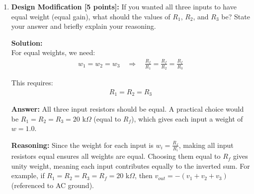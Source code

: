 \documentclass[11pt]{article}
\newenvironment{solution}
    {\color{blue}\textbf{Solution:}\\}
    {}
\begin{document}
\begin{enumerate}[label=\textbf{3.\arabic*}]
\begin{solution}
\textbf{Inverted and Weighted Output:}

The output is inverted because current flowing into the inverting node (from positive input voltages) must flow out through $R_f$, pulling the output below $V_{ref}$. Each input is weighted by its ratio $\frac{R_f}{R_i}$, meaning inputs with smaller resistors have larger weights (contribute more to the output). This allows precise control of how much each signal contributes to the sum.

\textbf{All Inputs at $V_{ref}$:}

If $v_1 = v_2 = v_3 = V_{ref} = 7.5$ V, then $(v_i - V_{ref}) = 0$ for all inputs. No current flows through any input resistor, so $i_f = 0$, and $v_{out} = V_{ref} = 7.5$ V. The output remains at the AC ground reference.

\textbf{Practical Application:}

Audio mixing consoles use summing amplifiers to combine multiple audio signals (microphones, instruments) into a single output channel. Each input can be weighted differently (volume control) by choosing appropriate resistor values, and the mixed signal can be inverted back if needed with another stage.
\end{solution}

\vspace{1cm}
    
    \item \textbf{Design Modification [5 points]:} If you wanted all three inputs to have equal weight (equal gain), what should the values of $R_1$, $R_2$, and $R_3$ be? State your answer and briefly explain your reasoning.

\begin{solution}
For equal weights, we need:
\begin{align*}
w_1 = w_2 = w_3 \quad \Rightarrow \quad \frac{R_f}{R_1} = \frac{R_f}{R_2} = \frac{R_f}{R_3}
\end{align*}

This requires:
\begin{align*}
R_1 = R_2 = R_3
\end{align*}

\textbf{Answer:} All three input resistors should be equal. A practical choice would be $R_1 = R_2 = R_3 = 20$ k$\Omega$ (equal to $R_f$), which gives each input a weight of $w = 1.0$.

\textbf{Reasoning:} Since the weight for each input is $w_i = \frac{R_f}{R_i}$, making all input resistors equal ensures all weights are equal. Choosing them equal to $R_f$ gives unity weight, meaning each input contributes equally to the inverted sum. For example, if $R_1 = R_2 = R_3 = R_f = 20$ k$\Omega$, then $v_{out} = -(v_1 + v_2 + v_3)$ (referenced to AC ground).
\end{solution}
\end{enumerate}
\end{document}

